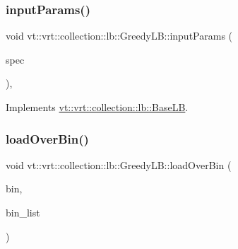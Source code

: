\subsubsection{\texorpdfstring{input\+Params()}{inputParams()}}
{\footnotesize\ttfamily void vt\+::vrt\+::collection\+::lb\+::\+Greedy\+L\+B\+::input\+Params (\begin{DoxyParamCaption}\item[{\hyperlink{structvt_1_1vrt_1_1collection_1_1balance_1_1_spec_entry}{balance\+::\+Spec\+Entry} $\ast$}]{spec }\end{DoxyParamCaption})\hspace{0.3cm}{\ttfamily [override]}, {\ttfamily [virtual]}}



Implements \hyperlink{structvt_1_1vrt_1_1collection_1_1lb_1_1_base_l_b_a555e29aadfd428383464d6dd007506b6}{vt\+::vrt\+::collection\+::lb\+::\+Base\+LB}.

\mbox{\label{structvt_1_1vrt_1_1collection_1_1lb_1_1_greedy_l_b_a2eebe9945964c405c237ae025d901c93}} 
\subsubsection{\texorpdfstring{load\+Over\+Bin()}{loadOverBin()}}
{\footnotesize\ttfamily void vt\+::vrt\+::collection\+::lb\+::\+Greedy\+L\+B\+::load\+Over\+Bin (\begin{DoxyParamCaption}\item[{\hyperlink{structvt_1_1vrt_1_1collection_1_1lb_1_1_base_l_b_ae0bff8fcf0dec0abc1d81836cf1d060a}{Obj\+Bin\+Type}}]{bin,  }\item[{\hyperlink{structvt_1_1vrt_1_1collection_1_1lb_1_1_base_l_b_ab29c64ca66a928f34cf638dad6163f80}{Obj\+Bin\+List\+Type} \&}]{bin\+\_\+list }\end{DoxyParamCaption})\hspace{0.3cm}{\ttfamily [private]}}

\mbox{\label{structvt_1_1vrt_1_1collection_1_1lb_1_1_greedy_l_b_a1d746659b257bc6897976b23deda3f2e}} 
